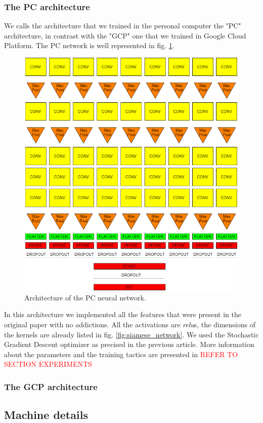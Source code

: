 \subsubsection{The PC architecture}
We calls the architecture that we trained in the personal computer the "PC" architecture, in contrast with the "GCP" one that we trained in Google Cloud Platform.\newline
The PC network is well represented in fig. \ref{fig:PC_net}.
\begin{figure}[!ht]
    \centering
    \includegraphics[scale=0.26]{images/PC_net.png}
    \caption{Architecture of the PC neural network.}
    \label{fig:PC_net}
\end{figure}
In this architecture we implemented all the features that were present in the original paper \cite{Noroozi_2016} with no addictions. All the activations are \emph{relu}s, the dimensions of the kernels are already listed in fig. \ref{fig:siamese_network}. We used the Stochastic Gradient Descent optimizer as precised in the previous article. More information about the parameters and the training tactics are presented in \textcolor{red}{REFER TO SECTION EXPERIMENTS}

\subsubsection{The GCP architecture}

\subsection{Machine details}\label{ss:machines}